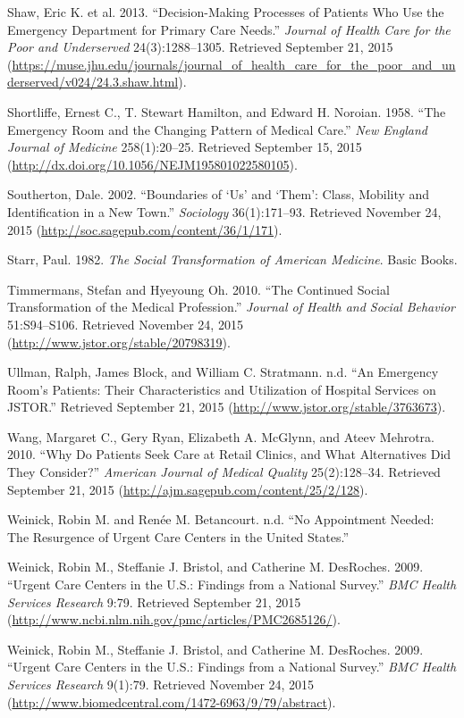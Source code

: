 \documentclass[12pt,twoside]{reedthesis}
\begin{document}
  Shaw, Eric K. et al. 2013. ``Decision-Making Processes of Patients Who
  Use the Emergency Department for Primary Care Needs.'' \emph{Journal of
  Health Care for the Poor and Underserved} 24(3):1288--1305. Retrieved
  September 21, 2015
  (\url{https://muse.jhu.edu/journals/journal_of_health_care_for_the_poor_and_underserved/v024/24.3.shaw.html}).
  
  Shortliffe, Ernest C., T. Stewart Hamilton, and Edward H. Noroian. 1958.
  ``The Emergency Room and the Changing Pattern of Medical Care.''
  \emph{New England Journal of Medicine} 258(1):20--25. Retrieved
  September 15, 2015
  (\url{http://dx.doi.org/10.1056/NEJM195801022580105}).
  
  Southerton, Dale. 2002. ``Boundaries of `Us' and `Them': Class, Mobility
  and Identification in a New Town.'' \emph{Sociology} 36(1):171--93.
  Retrieved November 24, 2015
  (\url{http://soc.sagepub.com/content/36/1/171}).
  
  Starr, Paul. 1982. \emph{The Social Transformation of American
  Medicine}. Basic Books.
  
  Timmermans, Stefan and Hyeyoung Oh. 2010. ``The Continued Social
  Transformation of the Medical Profession.'' \emph{Journal of Health and
  Social Behavior} 51:S94--S106. Retrieved November 24, 2015
  (\url{http://www.jstor.org/stable/20798319}).
  
  Ullman, Ralph, James Block, and William C. Stratmann. n.d. ``An
  Emergency Room's Patients: Their Characteristics and Utilization of
  Hospital Services on JSTOR.'' Retrieved September 21, 2015
  (\url{http://www.jstor.org/stable/3763673}).
  
  Wang, Margaret C., Gery Ryan, Elizabeth A. McGlynn, and Ateev Mehrotra.
  2010. ``Why Do Patients Seek Care at Retail Clinics, and What
  Alternatives Did They Consider?'' \emph{American Journal of Medical
  Quality} 25(2):128--34. Retrieved September 21, 2015
  (\url{http://ajm.sagepub.com/content/25/2/128}).
  
  Weinick, Robin M. and Ren{é}e M. Betancourt. n.d. ``No Appointment
  Needed: The Resurgence of Urgent Care Centers in the United States.''
  
  Weinick, Robin M., Steffanie J. Bristol, and Catherine M. DesRoches.
  2009. ``Urgent Care Centers in the U.S.: Findings from a National
  Survey.'' \emph{BMC Health Services Research} 9:79. Retrieved September
  21, 2015 (\url{http://www.ncbi.nlm.nih.gov/pmc/articles/PMC2685126/}).
  
  Weinick, Robin M., Steffanie J. Bristol, and Catherine M. DesRoches.
  2009. ``Urgent Care Centers in the U.S.: Findings from a National
  Survey.'' \emph{BMC Health Services Research} 9(1):79. Retrieved
  November 24, 2015
  (\url{http://www.biomedcentral.com/1472-6963/9/79/abstract}).
  
\end{document}
